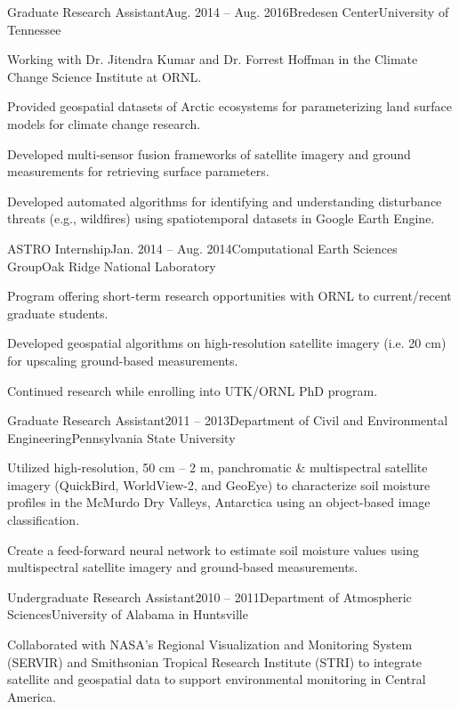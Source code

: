 \documentclass{tidycv} %
\begin{document}
\begin{cvresearches}

\begin{cvresearch}{Graduate Research Assistant}{Aug. 2014 -- Aug. 2016}{Bredesen Center}{University of Tennessee}
 \item Working with Dr. Jitendra Kumar and Dr. Forrest Hoffman in the Climate Change Science Institute at ORNL.
 \item Provided geospatial datasets of Arctic ecosystems for parameterizing land surface models for climate change research.
 \item  Developed multi-sensor fusion frameworks of satellite imagery and ground measurements for retrieving surface parameters.
 \item  Developed automated algorithms for identifying and understanding disturbance threats
(e.g., wildfires) using spatiotemporal datasets in Google Earth Engine.
\end{cvresearch}

\begin{cvresearch}{ASTRO Internship}{Jan. 2014 -- Aug. 2014}{Computational Earth Sciences Group}{Oak Ridge National Laboratory}
 \item Program offering short-term research opportunities with ORNL to current/recent graduate students. 
 \item Developed geospatial algorithms on high-resolution satellite imagery (i.e. 20 cm) for upscaling ground-based measurements.
 \item Continued research while enrolling into UTK/ORNL PhD program.
\end{cvresearch}

\begin{cvresearch}{Graduate Research Assistant}{2011 -- 2013}{Department of Civil and Environmental Engineering}{Pennsylvania State University}
 \item Utilized high-resolution, 50 cm -- 2 m, panchromatic \& multispectral satellite imagery
(QuickBird, WorldView-2, and GeoEye) to characterize soil moisture profiles in the McMurdo Dry Valleys, Antarctica using an object-based image classification. 
 \item Create a feed-forward neural network to estimate soil moisture values using multispectral satellite imagery and ground-based measurements.
\end{cvresearch}

\begin{cvresearch}{Undergraduate Research Assistant}{2010 -- 2011}{Department of Atmospheric Sciences}{University of Alabama in Huntsville}
\item Collaborated with NASA's Regional Visualization and Monitoring System (SERVIR) and
Smithsonian Tropical Research Institute (STRI) to integrate satellite and geospatial data
to support environmental monitoring in Central America.
\end{cvresearch}

\end{cvresearches}
\end{document}

